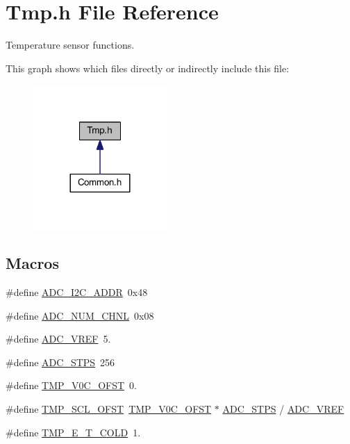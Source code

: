 \hypertarget{a00042}{\section{Tmp.\-h File Reference}
\label{a00042}
}


Temperature sensor functions.  


This graph shows which files directly or indirectly include this file\-:
\nopagebreak
\begin{figure}[H]
\begin{center}
\leavevmode
\includegraphics[width=144pt]{a00060}
\end{center}
\end{figure}
\subsection*{Macros}
\begin{DoxyCompactItemize}
\item 
\#define \hyperlink{a00042_a5fd3aabe18504a5314a5d0e71e3bc495}{A\-D\-C\-\_\-\-I2\-C\-\_\-\-A\-D\-D\-R}~0x48
\item 
\#define \hyperlink{a00042_a448e8a52be570dfe9fdddb2045039534}{A\-D\-C\-\_\-\-N\-U\-M\-\_\-\-C\-H\-N\-L}~0x08
\item 
\#define \hyperlink{a00042_a5a03d0b939a8dda552c9fe3319a82485}{A\-D\-C\-\_\-\-V\-R\-E\-F}~5.
\item 
\#define \hyperlink{a00042_a9be6401f8c9339711816bec5ca55dd88}{A\-D\-C\-\_\-\-S\-T\-P\-S}~256
\item 
\#define \hyperlink{a00042_a6d41a70e126c748f2c99c3ff8228eb1b}{T\-M\-P\-\_\-\-V0\-C\-\_\-\-O\-F\-S\-T}~0.
\item 
\#define \hyperlink{a00042_a0f910bb108922c8686a139977510af53}{T\-M\-P\-\_\-\-S\-C\-L\-\_\-\-O\-F\-S\-T}~\hyperlink{a00042_a6d41a70e126c748f2c99c3ff8228eb1b}{T\-M\-P\-\_\-\-V0\-C\-\_\-\-O\-F\-S\-T} $\ast$ \hyperlink{a00042_a9be6401f8c9339711816bec5ca55dd88}{A\-D\-C\-\_\-\-S\-T\-P\-S} / \hyperlink{a00042_a5a03d0b939a8dda552c9fe3319a82485}{A\-D\-C\-\_\-\-V\-R\-E\-F}
\item 
\#define \hyperlink{a00042_acc66f9f90ea4746679f5d26c834ddea5}{T\-M\-P\-\_\-\-E\-\_\-\-T\-\_\-\-C\-O\-L\-D}~1.
\end{DoxyCompactItemize}
